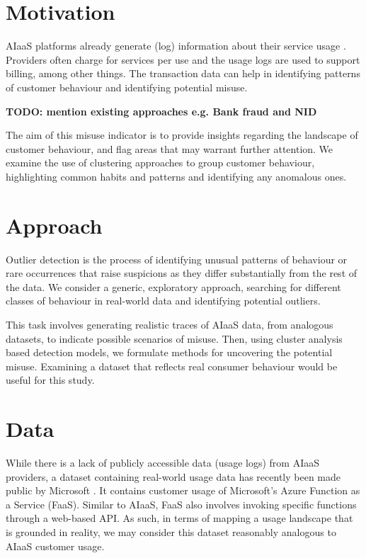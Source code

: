 \documentclass[a4paper,12pt]{report}
\begin{document}
	\section{Motivation}
	
	AIaaS platforms already generate (log) information about their service usage \cite{shahrad2020serverless}. Providers often charge for services per use and the usage logs are used to support billing, among other things. The transaction data can help in identifying patterns of customer behaviour and identifying potential misuse.
	
	\textbf{TODO: mention existing approaches e.g. Bank fraud and NID}
	
	The aim of this misuse indicator is to provide insights regarding the landscape of customer behaviour, and flag areas that may warrant further attention. We examine the use of clustering approaches to group customer behaviour, highlighting common habits and patterns and identifying any anomalous ones. 
	
	\section{Approach}
	Outlier detection is the process of identifying unusual patterns of behaviour or rare occurrences that raise suspicions as they differ substantially from the rest of the data. We consider a generic, exploratory approach, searching for different classes of behaviour in real-world data and identifying potential outliers. 
	
	This task involves generating realistic traces of AIaaS data, from analogous datasets, to 
	indicate possible scenarios of misuse. Then, using cluster analysis based detection models, we formulate methods for uncovering the potential misuse. Examining a dataset that reflects real consumer behaviour would be useful for this study.
	
	\section{Data}
	While there is a lack of publicly accessible data (usage logs) from AIaaS providers, a dataset containing real-world usage data has recently been made public by Microsoft \cite{shahrad2020serverless}. It contains customer usage of Microsoft’s Azure Function as a Service (FaaS). Similar to AIaaS, FaaS also involves invoking specific functions through a web-based API. As such, in terms of mapping a usage landscape that is grounded in reality, we may consider this dataset reasonably analogous to AIaaS customer usage. 
	
\end{document}
